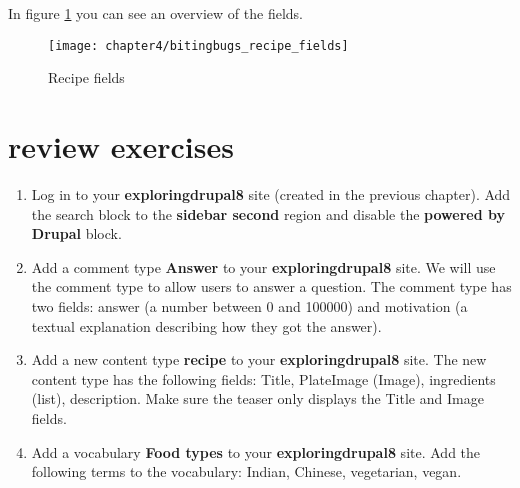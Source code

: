     In figure \ref{fig:bitingbugs_recipe_fields} you can see an overview of the fields.
    
    \begin{figure}[H]
    	\centering
    	\texttt{[image: chapter4/bitingbugs\_recipe\_fields]}
    	\caption{Recipe fields}
    	\label{fig:bitingbugs_recipe_fields}
    \end{figure}
  
  \section{review exercises}
  
  \begin{enumerate}
  	\item Log in to your \textbf{exploringdrupal8} site (created in the previous chapter). Add the search block to the \textbf{sidebar second} region and disable the \textbf{powered by Drupal} block.
  	
  	
  	\item Add a comment type \textbf{Answer} to your \textbf{exploringdrupal8} site. We will use the comment type to allow users to answer a question. The comment type has two fields: answer (a number between 0 and 100000) and motivation (a textual explanation describing how they got the answer).
  	
  	\item Add a new content type \textbf{recipe} to your \textbf{exploringdrupal8} site. The new content type has the following fields: Title, PlateImage (Image), ingredients (list), description. Make sure the teaser only displays the Title and Image fields.
  	
  	\item Add a vocabulary \textbf{Food types} to your \textbf{exploringdrupal8} site. Add the following terms to the vocabulary: Indian, Chinese, vegetarian, vegan. 
  	
  	
  \end{enumerate}